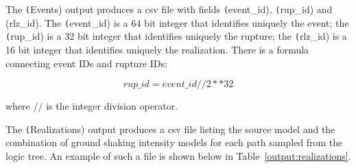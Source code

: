 The \texttt(Events) output produces a csv file with fields \texttt(event\_id),
\texttt(rup\_id) and \texttr(rlz\_id). The \texttt(event\_id) is a 64 bit
integer that identifies uniquely the event; the \texttt(rup\_id)
is a 32 bit integer that identifies uniquely the rupture; the \texttt(rlz\_id)
is a 16 bit integer that identifies uniquely the
realization. There is a formula connecting event IDs and rupture IDs:

$$
rup\_id = event\_ id // 2 ** 32
$$

where $//$ is the integer division operator.

The \texttt(Realizations) output produces a csv file listing the source model
and the combination of ground shaking intensity models for each path sampled
from the logic tree. An example of such a file is shown below in
Table~\ref{output:realizations}.


